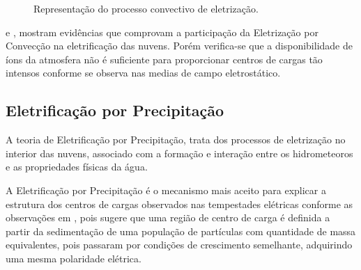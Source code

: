 
\begin{figure}[ht]
   \centering
   \caption{Representação do processo convectivo de eletrização.}
   \label{fig:elec}
\end{figure}

 e , mostram evidências que comprovam a participação da Eletrização por Convecção na eletrificação das nuvens. Porém verifica-se que a disponibilidade de íons da atmosfera não é suficiente para proporcionar centros de cargas tão intensos conforme se observa nas medias de campo eletrostático. 

\subsection{Eletrificação por Precipitação}

A teoria de Eletrificação por Precipitação, trata dos processos de eletrização no interior das nuvens, associado com a formação e  interação entre os hidrometeoros e as propriedades físicas da água.


A Eletrificação por Precipitação é o mecanismo mais aceito para explicar a estrutura dos centros de cargas observados nas tempestades elétricas conforme as observações em , pois sugere que uma região de centro de carga é definida a partir da sedimentação de uma população de partículas com quantidade de massa equivalentes, pois passaram por condições de crescimento semelhante, adquirindo uma mesma polaridade elétrica. 


